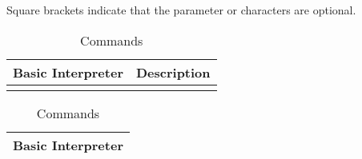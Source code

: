 \documentclass[11pt,fleqn]{book} %
\numberwithin{equation}{section} %
\numberwithin{figure}{section} %
\numberwithin{table}{section} %
\begin{document}
Square brackets indicate that the parameter or characters are optional.
\begin{table}[]
\centering
\caption{Commands}
\label{Commands}
\begin{tabular}{|p{4cm}|p{10cm}|}
\hline
\textbf{Basic Interpreter} & \textbf{Description}                                                   \\ \hline
\\ \hline
\end{tabular}
\end{table}

\newpage
\begin{center}
\begin{longtable}{l}
\caption{Commands} \label{Commands}\\

\hline
\textbf{Basic Interpreter} \\ 
\hline 
\endfirsthead


\end{longtable}
\end{center}
\end{document}

